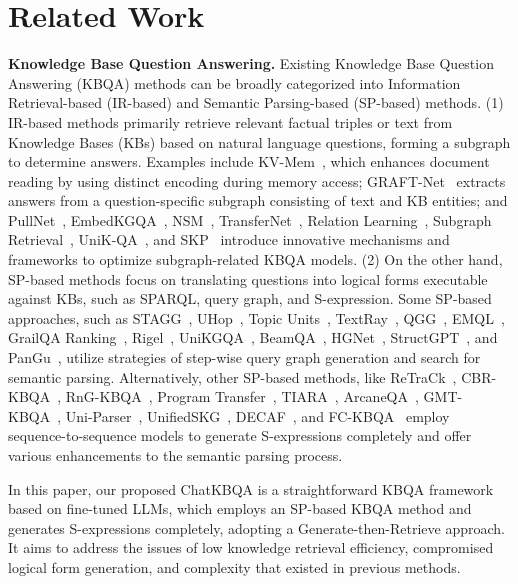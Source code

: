 \documentclass{article} \usepackage{iclr2024_conference,times}
\begin{document}
\section{Related Work}
\label{s2}
\textbf{Knowledge Base Question Answering.}
Existing Knowledge Base Question Answering (KBQA) methods can be broadly categorized into Information Retrieval-based (IR-based) and Semantic Parsing-based (SP-based) methods. (1) IR-based methods primarily retrieve relevant factual triples or text from Knowledge Bases (KBs) based on natural language questions, forming a subgraph to determine answers. Examples include KV-Mem~\citep{KV-Mem}, which enhances document reading by using distinct encoding during memory access; GRAFT-Net~\citep{GRAFT-Net} extracts answers from a question-specific subgraph consisting of text and KB entities; and PullNet~\citep{PullNet}, EmbedKGQA~\citep{EmbedKGQA}, NSM~\citep{NSM}, TransferNet~\citep{TransferNet}, Relation Learning~\citep{RelationLearning}, Subgraph Retrieval~\citep{SubgraphRetrieval}, UniK-QA~\citep{UniK-QA}, and SKP~\citep{SKP} introduce innovative mechanisms and frameworks to optimize subgraph-related KBQA models. (2) On the other hand, SP-based methods focus on translating questions into logical forms executable against KBs, such as SPARQL, query graph, and S-expression. Some SP-based approaches, such as STAGG~\citep{STAGG}, UHop~\citep{UHop}, Topic Units~\citep{TopicUnits}, TextRay~\citep{TextRay}, QGG~\citep{QGG}, EMQL~\citep{EMQL}, GrailQA Ranking~\citep{GrailQA}, Rigel~\citep{Rigel}, UniKGQA~\citep{UniKGQA}, BeamQA~\citep{BeamQA}, HGNet~\citep{HGNet}, StructGPT~\citep{StructGPT}, and PanGu~\citep{PanGu}, utilize strategies of step-wise query graph generation and search for semantic parsing. Alternatively, other SP-based methods, like ReTraCk~\citep{ReTraCk}, CBR-KBQA~\citep{CBR-KBQA}, RnG-KBQA~\citep{RnG-KBQA}, Program Transfer~\citep{ProgramTransfer}, TIARA~\citep{TIARA}, ArcaneQA~\citep{ArcaneQA}, GMT-KBQA~\citep{GMT-KBQA}, Uni-Parser~\citep{Uni-Parser}, UnifiedSKG~\citep{UnifiedSKG}, DECAF~\citep{DECAF}, and FC-KBQA~\citep{FC-KBQA} employ sequence-to-sequence models to generate S-expressions completely and offer various enhancements to the semantic parsing process.

In this paper, our proposed ChatKBQA is a straightforward KBQA framework based on fine-tuned LLMs, which employs an SP-based KBQA method and generates S-expressions completely, adopting a Generate-then-Retrieve approach. It aims to address the issues of low knowledge retrieval efficiency, compromised logical form generation, and complexity that existed in previous methods.
\end{document}
